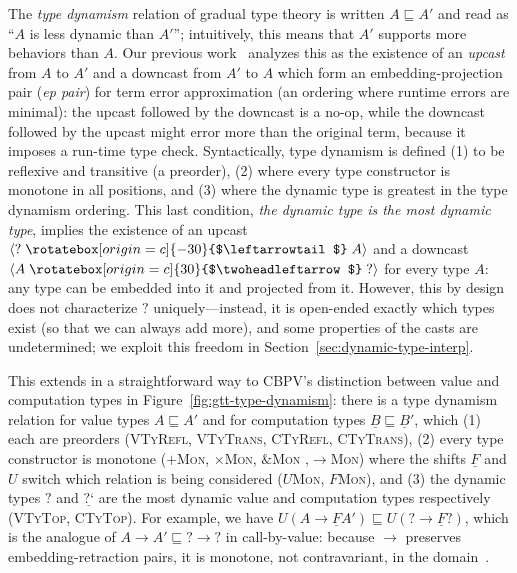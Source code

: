 \documentclass[acmsmall,nonacm]{acmart}
\renewcommand{\u}{\underline}
\newcommand{\ltdyn}{\sqsubseteq}
\newcommand{\dynv}{{?}}
\newcommand{\dync}{\u {\text{?`}}}
\newcommand{\uarrow}{\mathrel{\rotatebox[origin=c]{-30}{$\leftarrowtail$}}}
\newcommand{\darrow}{\mathrel{\rotatebox[origin=c]{30}{$\twoheadleftarrow$}}}
\newcommand{\upcast}[2]{\langle{#2}\uarrow{#1}\rangle}
\newcommand{\dncast}[2]{\langle{#1}\darrow{#2}\rangle}
\newcommand{\with}{\mathbin{\&}}
\begin{document}
The \emph{type dynamism} relation of gradual type theory is written $A
\ltdyn A'$ and read as ``$A$ is less dynamic than $A'$''; intuitively,
this means that $A'$ supports more behaviors than $A$.
Our previous work~\citep{newahmed18,newlicata2018-fscd} analyzes this as the existence of an \emph{upcast}
from $A$ to $A'$ and a downcast from $A'$ to $A$ which form an
embedding-projection pair (\emph{ep pair}) for term error approximation
(an ordering where runtime errors are minimal): the upcast followed by the
downcast is a no-op, while the downcast followed by the upcast might
error more than the original term, because it imposes a run-time type
check.  Syntactically, type dynamism is defined (1) to be reflexive and
transitive (a preorder), (2) where every type constructor is monotone in
all positions, and (3) where the dynamic type is greatest in the type
dynamism ordering.  This last condition, \emph{the
  dynamic type is the most dynamic type}, implies the existence of an
upcast $\upcast{A}{\dynv}$ and a downcast $\dncast{A}{\dynv}$ for every
type $A$: any type can be embedded
into it and projected from it.  However, this by design does not
characterize $\dynv$ uniquely---instead, it is open-ended exactly
which types exist (so that we can always add more), and some properties
of the casts are undetermined; we exploit this freedom in
Section~\ref{sec:dynamic-type-interp}.

This extends in a straightforward way to CBPV's distinction between
value and computation types in Figure~\ref{fig:gtt-type-dynamism}: there
is a type dynamism relation for value types $A \ltdyn A'$ and for
computation types $\u B \ltdyn \u B'$, which (1) each are preorders
(\textsc{VTyRefl}, \textsc{VTyTrans}, \textsc{CTyRefl}, \textsc{CTyTrans}),
(2) every type constructor is monotone
(\textsc{$+$Mon}, \textsc{$\times$Mon}, \textsc{$\with$Mon} ,\textsc{$\to$Mon})
where the shifts $\u F$ and $U$ switch which relation is being
considered (\textsc{$U$Mon}, \textsc{$F$Mon}), and (3) the dynamic types
$\dynv$ and $\dync$ are the most dynamic value and computation types
respectively (\textsc{VTyTop}, \textsc{CTyTop}).  For example, we have
$U(A \to \u F A') \ltdyn U(\dynv \to \u F \dynv)$, which is the analogue
of $A \to A' \ltdyn \dynv \to \dynv$ in call-by-value: because $\to$
preserves embedding-retraction pairs, it is monotone, not contravariant,
in the domain~\citep{newahmed18,newlicata2018-fscd}.
\end{document}
